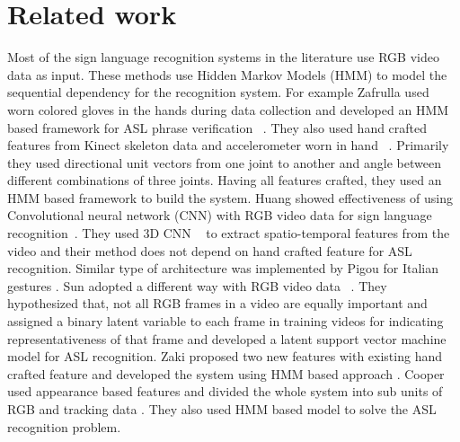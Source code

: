 \documentclass[10pt,twocolumn,letterpaper]{article}
\begin{document}
\section{Related work}
Most of the sign language recognition systems in the literature use RGB video data as input. These methods use Hidden Markov Models (HMM) to model the sequential dependency for the recognition system. For example Zafrulla \etal used worn colored gloves in the hands during data collection and developed an HMM based framework for ASL phrase verification ~\cite{copycat_zafrulla}. They also used hand crafted features from Kinect skeleton data and accelerometer worn in hand ~\cite{Zafrulla:2011:ASL:2070481.2070532}. Primarily they used directional unit vectors from one joint to another and angle between different combinations of three joints. Having all features crafted, they used an HMM based framework to build the system. Huang \etal showed effectiveness of using Convolutional neural network (CNN) with RGB video data for sign language recognition~\cite{7177428}. They used 3D CNN ~\cite{Ji:2013:CNN:2412386.2412939} to extract spatio-temporal features from the video and their method does not depend on hand crafted feature for ASL recognition. Similar type of architecture was implemented by Pigou \etal for Italian gestures \cite{978-3-319-16178-5_40}. Sun \etal adopted a different way with RGB video data ~\cite{Sun:2015:LSV:2753829.2629481}. They hypothesized that, not all RGB frames in a video are equally important and assigned a binary latent variable to each frame in training videos for indicating representativeness of that frame and developed a latent support vector machine model for ASL recognition. Zaki \etal proposed two new features with existing hand crafted feature and developed the system using HMM based approach \cite{ZAKI2011572}. Cooper \etal used appearance based features and divided the whole system into sub units of RGB and tracking data \cite{Cooper2017}. They also used HMM based model to solve the ASL recognition problem. 
\end{document}
